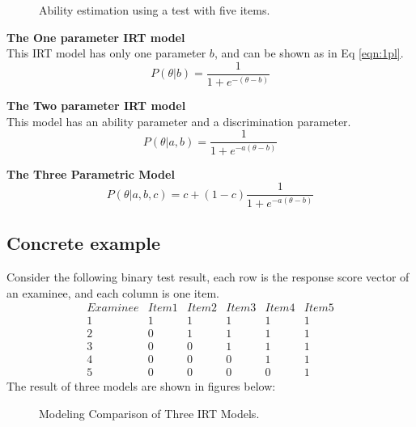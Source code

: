 \documentclass[a4paper]{article}
\begin{document}
\begin{enumerate}
\begin{figure}
            \caption{Ability estimation using a test with five items.}
            \label{fig:predict-ability}
        \end{figure}
\end{enumerate}

\textbf{The One parameter IRT model} \\
This IRT model has only one parameter $b$, and can be shown as in Eq
\ref{eqn:1pl}. 
\begin{equation}
    P(\theta|b) = \frac{1}{1+e^{-(\theta - b)}}
    \label{eqn:1pl}
\end{equation}

\textbf{The Two parameter IRT model}\\
This model has an ability parameter and a discrimination parameter.
\begin{equation}
    P(\theta|a,b) = \frac{1}{1+e^{-a(\theta - b)}}
    \label{eqn:2pl}
\end{equation}

\textbf{The Three Parametric Model} \\
\begin{equation}
    P(\theta|a,b,c) = c + (1-c)\frac{1}{1+e^{-a(\theta - b)}}
    \label{eqn:3pl}
\end{equation}

\subsection{Concrete example}
Consider the following binary test result, each row is the response score vector of an examinee, and each column is one item. 
\[\begin{array}{lccccc}
Examinee & Item1 & Item2 & Item3 & Item4 & Item5 \\ 
1 & 1 & 1 & 1 & 1 & 1 \\
2 & 0 & 1 & 1 & 1 & 1 \\
3 & 0 & 0 & 1 & 1 & 1 \\
4 & 0 & 0 & 0 & 1 & 1 \\
5 & 0 & 0 & 0 & 0 & 1
\end{array}
\]
The result of three models are shown in figures below:
\begin{figure}[ht]
\centering
{}
\label{fig:subfigureExample}
\caption[Three types of IRT Models]{Modeling Comparison of Three IRT Models.}
\end{figure}
\end{document}
